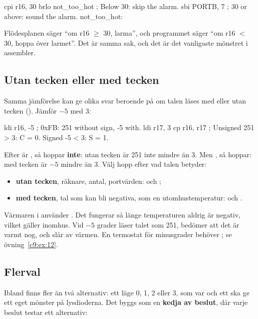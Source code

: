 \begin{asmcode}
    cpi r16, 30
    brlo not_too_hot                ; Below 30: skip the alarm.
    sbi PORTB, 7                    ; 30 or above: sound the alarm.
not_too_hot:
\end{asmcode}

\noindent Flödesplanen säger \enquote{om r16 $\geq$ 30, larma}, och programmet säger
\enquote{om r16 $<$ 30, hoppa över larmet}. Det är samma sak, och det är det vanligaste
mönstret i assembler.

\subsection{Utan tecken eller med tecken}
\label{c9:a6}
Samma jämförelse kan ge olika svar beroende på om talen läses med eller utan tecken
(). Jämför $-5$ med 3:

\begin{asmcode}
    ldi r16, -5                 ; 0xFB: 251 without sign, -5 with.
    ldi r17, 3
    cp r16, r17                 ; Unsigned 251 > 3: C = 0. Signed -5 < 3: S = 1.
\end{asmcode}

\noindent Efter  är , så  hoppar \textbf{inte}: utan tecken är 251
inte mindre än 3. Men , så  hoppar: med tecken är $-5$ mindre än 3. Välj
hopp efter vad talen betyder:
\begin{itemize}
  \item \textbf{utan tecken}, räknare, antal, portvärden:  och ;
  \item \textbf{med tecken}, tal som kan bli negativa, som en utomhustemperatur:  och
    .
\end{itemize}

Värmaren i  använder . Det fungerar så länge temperaturen aldrig är
negativ, vilket gäller inomhus. Vid $-5$ grader läser  talet som 251, bedömer att det är
varmt nog, och slår av värmen. En termostat för minusgrader behöver ; se
övning~\ref{c9:ex:12}.

\subsection{Flerval}
\label{c9:a7}
Ibland finns fler än två alternativ: ett läge 0, 1, 2 eller 3, som var och ett ska ge ett eget
mönster på lysdioderna. Det byggs som en \textbf{kedja av beslut}, där varje beslut testar ett
alternativ:

